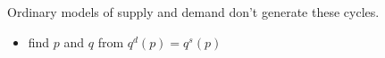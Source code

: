 \documentclass[
    xcolor={svgnames,dvipsnames},
    hyperref={colorlinks, citecolor=DeepPink4, linkcolor=DarkRed, urlcolor=DarkBlue}
    ]{beamer}  %
\newcommand{\1}{\mathbbm 1}
\begin{document}
\begin{frame}
    
    \begin{figure}
        \centering
    \end{figure}

\end{frame}


\begin{frame}

    Ordinary models of supply and demand don't generate these cycles.

    \begin{itemize}
        \item find $p$ and $q$ from $q^d(p) = q^s(p)$
    \end{itemize}

    \begin{figure}
        \centering
    \end{figure}
    

\end{frame}
\end{document}
